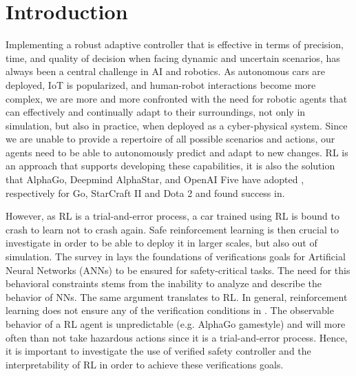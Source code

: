 \documentclass[a4paper,11pt]{article}
\begin{document}
\section{Introduction}
Implementing a robust adaptive controller that is effective in terms of precision, time, and quality of decision
when facing dynamic and uncertain scenarios, has always been a central challenge in AI and robotics.
As autonomous cars are deployed, IoT is popularized, and human-robot interactions become more complex, we
are more and more confronted with the need for robotic agents that can effectively and continually adapt
to their surroundings, not only in simulation, but also in practice, when deployed as a cyber-physical system. 
Since we are unable to provide a repertoire of all possible scenarios and actions,
our agents need to be able to autonomously predict and adapt to new changes. RL is an approach that
supports developing these capabilities, it is also the solution that AlphaGo, Deepmind AlphaStar, and OpenAI Five have
adopted \cite{li2019reinforcement}, respectively for Go, StarCraft II and Dota 2 and found success in. 

However, as RL is a trial-and-error process, a car trained using RL is bound to crash to learn not to crash again. Safe reinforcement learning is then crucial 
to investigate in order to be able to deploy it in larger scales, but also out of simulation. 
The survey in \cite{kurdkelly2003} lays the foundations of verifications goals for Artificial Neural Networks (ANNs) to be ensured for safety-critical tasks. The need for this behavioral constraints stems from the inability to analyze and 
describe the behavior of NNs. The same argument translates to RL. In general, reinforcement learning does not ensure any of the verification conditions in \cite{kurdkelly2003}. 
The observable behavior of a RL agent is unpredictable (e.g. AlphaGo gamestyle) and will more often than not take hazardous actions since it is a trial-and-error process. Hence, it is important to investigate
the use of verified safety controller and the interpretability of RL in order to achieve these verifications goals.  
\end{document}
